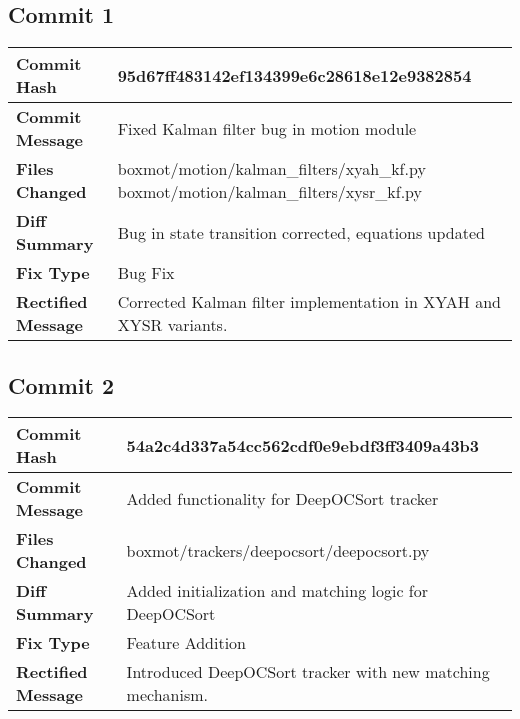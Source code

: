 \documentclass[12pt, a4paper]{report}
\begin{document}
\subsection*{Commit 1}
\begin{tabular}{|p{3cm}|p{10cm}|}
\hline
\textbf{Commit Hash} & 95d67ff483142ef134399e6c28618e12e9382854 \\
\hline
\textbf{Commit Message} & Fixed Kalman filter bug in motion module \\
\hline
\textbf{Files Changed} & 
boxmot/motion/kalman\_filters/xyah\_kf.py \newline
boxmot/motion/kalman\_filters/xysr\_kf.py \\
\hline
\textbf{Diff Summary} & Bug in state transition corrected, equations updated \\
\hline
\textbf{Fix Type} & Bug Fix \\
\hline
\textbf{Rectified Message} & Corrected Kalman filter implementation in XYAH and XYSR variants. \\
\hline
\end{tabular}

\vspace{1cm}

\subsection*{Commit 2}
\begin{tabular}{|p{3cm}|p{10cm}|}
\hline
\textbf{Commit Hash} & 54a2c4d337a54cc562cdf0e9ebdf3ff3409a43b3 \\
\hline
\textbf{Commit Message} & Added functionality for DeepOCSort tracker \\
\hline
\textbf{Files Changed} & 
boxmot/trackers/deepocsort/deepocsort.py \\
\hline
\textbf{Diff Summary} & Added initialization and matching logic for DeepOCSort \\
\hline
\textbf{Fix Type} & Feature Addition \\
\hline
\textbf{Rectified Message} & Introduced DeepOCSort tracker with new matching mechanism. \\
\hline
\end{tabular}

\vspace{1cm}

\end{document}
